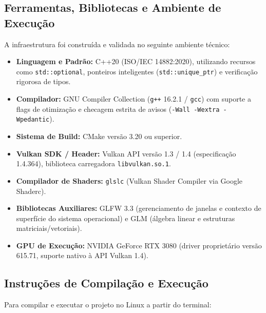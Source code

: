 \subsection{Ferramentas, Bibliotecas e Ambiente de Execução}
A infraestrutura foi construída e validada no seguinte ambiente técnico:
\begin{itemize}
    \setlength{\itemsep}{0pt}
    \item \textbf{Linguagem e Padrão:} C++20 (ISO/IEC 14882:2020), utilizando recursos como \texttt{std::optional}, ponteiros inteligentes (\texttt{std::unique\_ptr}) e verificação rigorosa de tipos.
    \item \textbf{Compilador:} GNU Compiler Collection (\texttt{g++} 16.2.1 / \texttt{gcc}) com suporte a flags de otimização e checagem estrita de avisos (\texttt{-Wall -Wextra -Wpedantic}).
    \item \textbf{Sistema de Build:} CMake versão 3.20 ou superior.
    \item \textbf{Vulkan SDK / Header:} Vulkan API versão 1.3 / 1.4 (especificação 1.4.364), biblioteca carregadora \texttt{libvulkan.so.1}.
    \item \textbf{Compilador de Shaders:} \texttt{glslc} (Vulkan Shader Compiler via Google Shaderc).
    \item \textbf{Bibliotecas Auxiliares:} GLFW 3.3 (gerenciamento de janelas e contexto de superfície do sistema operacional) e GLM (álgebra linear e estruturas matriciais/vetoriais).
    \item \textbf{GPU de Execução:} NVIDIA GeForce RTX 3080 (driver proprietário versão 615.71, suporte nativo à API Vulkan 1.4).
\end{itemize}

\subsection{Instruções de Compilação e Execução}

Para compilar e executar o projeto no Linux a partir do terminal:

